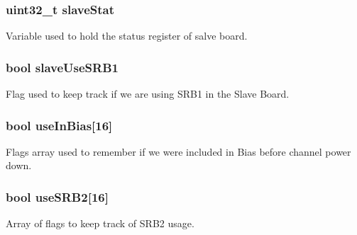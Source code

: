 \subsubsection[{slave\+Stat}]{\setlength{\rightskip}{0pt plus 5cm}uint32\+\_\+t slave\+Stat}\label{group___a_d_s1299___library_ga107f0202d1ef78dcc5b63e143044ffdf}


Variable used to hold the status register of salve board. 

\hypertarget{group___a_d_s1299___library_gab67cf8829f1fda0edfe4fcb89a00f8d1}{}
\subsubsection[{slave\+Use\+S\+R\+B1}]{\setlength{\rightskip}{0pt plus 5cm}bool slave\+Use\+S\+R\+B1}\label{group___a_d_s1299___library_gab67cf8829f1fda0edfe4fcb89a00f8d1}


Flag used to keep track if we are using S\+R\+B1 in the Slave Board. 

\hypertarget{group___a_d_s1299___library_gaab7b7dca51dd80f61785f355b03b0555}{}
\subsubsection[{use\+In\+Bias}]{\setlength{\rightskip}{0pt plus 5cm}bool use\+In\+Bias\mbox{[}16\mbox{]}}\label{group___a_d_s1299___library_gaab7b7dca51dd80f61785f355b03b0555}


Flags array used to remember if we were included in Bias before channel power down. 

\hypertarget{group___a_d_s1299___library_ga96bc68ed80305391fa5bbcc88557d776}{}
\subsubsection[{use\+S\+R\+B2}]{\setlength{\rightskip}{0pt plus 5cm}bool use\+S\+R\+B2\mbox{[}16\mbox{]}}\label{group___a_d_s1299___library_ga96bc68ed80305391fa5bbcc88557d776}


Array of flags to keep track of S\+R\+B2 usage. 

